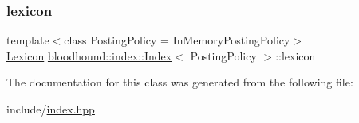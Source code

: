 \subsubsection{\texorpdfstring{lexicon}{lexicon}}
{\footnotesize\ttfamily template$<$class Posting\+Policy = In\+Memory\+Posting\+Policy$>$ \\
\hyperlink{namespacebloodhound_a94032a3533df0a1b6d3435bad57e6499}{Lexicon} \hyperlink{classbloodhound_1_1index_1_1Index}{bloodhound\+::index\+::\+Index}$<$ Posting\+Policy $>$\+::lexicon}



The documentation for this class was generated from the following file\+:\begin{DoxyCompactItemize}
\item 
include/\hyperlink{index_8hpp}{index.\+hpp}\end{DoxyCompactItemize}

